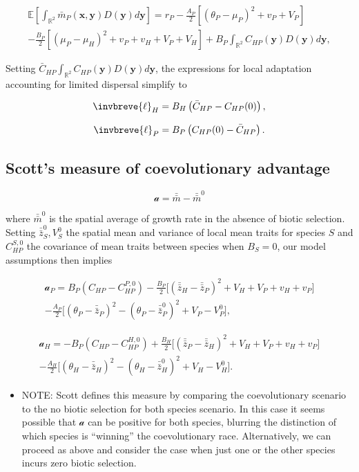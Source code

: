 \documentclass{article}
\begin{document}
\begin{multline}
  \mathbb E\left[\int_{\mathbb R^2}\bar m_P(\pmb x,\pmb y)
  D(\pmb y)d\pmb y\right]= 
  r_P-\frac{A_P}{2}[(\theta_P-\mu_P)^2+v_P+V_P] \\
  -\frac{B_P}{2}[(\mu_P-\mu_H)^2+v_P+v_H+V_P+V_H]
  +B_P\int_{\mathbb R^2}C_{HP}(\pmb y)D(\pmb y)d\pmb y,
\end{multline}

Setting \(\bar C_{HP}\int_{\mathbb R^2}C_{HP}(\pmb y)D(\pmb y)d\pmb y\),
the expressions for local adaptation accounting for limited dispersal
simplify to

\[\invbreve{\ell}_H=B_H\left(\bar C_{HP}-C_{HP}(0)\right),\]

\[\invbreve{\ell}_P=B_P\left(C_{HP}(0)-\bar C_{HP}\right).\]

\hypertarget{scotts-measure-of-coevolutionary-advantage}{%
\subsection{Scott's measure of coevolutionary
advantage}\label{scotts-measure-of-coevolutionary-advantage}}

\[\mathcal a=\bar{\bar m}-\bar{\bar m}^0\]

where \(\bar{\bar m}^0\) is the spatial average of growth rate in the
absence of biotic selection. Setting \(\bar{\bar z}_S^0, V_S^0\) the
spatial mean and variance of local mean traits for species \(S\) and
\(C_{HP}^{S,0}\) the covariance of mean traits between species when
\(B_S=0\), our model assumptions then implies

\begin{multline}
  \mathcal a_P=B_P(C_{HP}-C_{HP}^{P,0})-\frac{B_P}{2}\big[(\bar{\bar z}_H-\bar{\bar z}_P)^2+V_H+V_P+v_H+v_P\big] \\
  -\frac{A_P}{2}\big[(\theta_P-\bar{\bar z}_P)^2-(\theta_P-\bar{\bar z}_P^0)^2+V_P-V_P^0\big],
\end{multline}

\begin{multline}
  \mathcal a_H=-B_P(C_{HP}-C_{HP}^{H,0})+\frac{B_H}{2}\big[(\bar{\bar z}_P-\bar{\bar z}_H)^2+V_H+V_P+v_H+v_P\big] \\
  -\frac{A_H}{2}\big[(\theta_H-\bar{\bar z}_H)^2-(\theta_H-\bar{\bar z}_H^0)^2+V_H-V_H^0\big].
\end{multline}

\begin{itemize}
\tightlist
\item
  NOTE: Scott defines this measure by comparing the coevolutionary
  scenario to the no biotic selection for both species scenario. In this
  case it seems possible that \(\mathcal a\) can be positive for both
  species, blurring the distinction of which species is ``winning'' the
  coevolutionary race. Alternatively, we can proceed as above and
  consider the case when just one or the other species incurs zero
  biotic selection.
\end{itemize}
\end{document}
